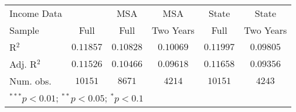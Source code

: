 \begin{tabular}{l c c c c c}
Income Data          &                  & MSA              & MSA             & State            & State           \\
Sample               & Full             & Full             & Two Years       & Full             & Two Years       \\
R$^2$                & $0.11857$        & $0.10828$        & $0.10069$       & $0.11997$        & $0.09805$       \\
Adj. R$^2$           & $0.11526$        & $0.10466$        & $0.09618$       & $0.11658$        & $0.09356$       \\
Num. obs.            & $10151$          & $8671$           & $4214$          & $10151$          & $4243$          \\
\hline
\multicolumn{6}{l}{\scriptsize{$^{***}p<0.01$; $^{**}p<0.05$; $^{*}p<0.1$}}
\end{tabular}
